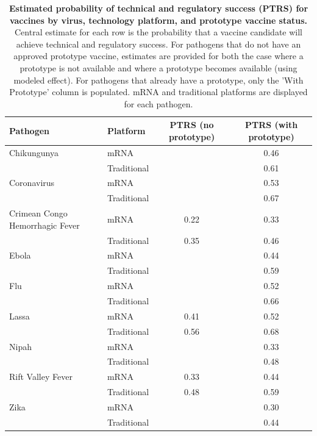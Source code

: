\begin{table}[!htbp]
\caption{\textbf{Estimated probability of technical and regulatory success (PTRS) for vaccines by virus, technology platform, and prototype vaccine status.} Central estimate for each row is the probability that a vaccine candidate will achieve technical and regulatory success. For pathogens that do not have an approved prototype vaccine, estimates are provided for both the case where a prototype is not available and where a prototype becomes available (using modeled effect). For pathogens that already have a prototype, only the 'With Prototype' column is populated. mRNA and traditional platforms are displayed for each pathogen.}
\label{tab:ptrs-for-sims}
\begin{tabular}{llcc}
\hline\hline
Pathogen & Platform & PTRS (no prototype) & PTRS (with prototype) \\
\hline
Chikungunya & mRNA &  & 0.46 \\
 & Traditional &  & 0.61 \\
Coronavirus & mRNA &  & 0.53 \\
 & Traditional &  & 0.67 \\
Crimean Congo Hemorrhagic Fever & mRNA & 0.22 & 0.33 \\
 & Traditional & 0.35 & 0.46 \\
Ebola & mRNA &  & 0.44 \\
 & Traditional &  & 0.59 \\
Flu & mRNA &  & 0.52 \\
 & Traditional &  & 0.66 \\
Lassa & mRNA & 0.41 & 0.52 \\
 & Traditional & 0.56 & 0.68 \\
Nipah & mRNA &  & 0.33 \\
 & Traditional &  & 0.48 \\
Rift Valley Fever & mRNA & 0.33 & 0.44 \\
 & Traditional & 0.48 & 0.59 \\
Zika & mRNA &  & 0.30 \\
 & Traditional &  & 0.44 \\
\hline\hline
\end{tabular}
\end{table}

